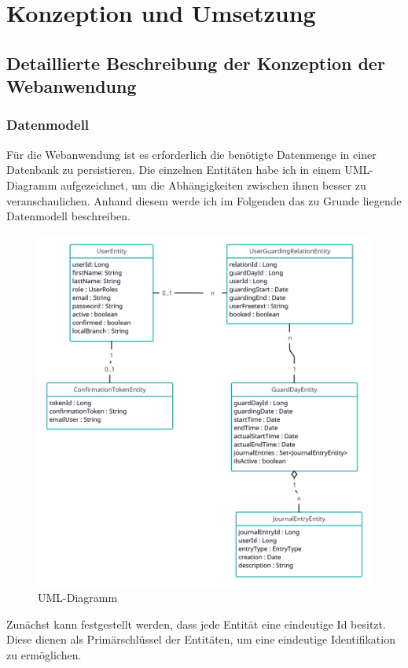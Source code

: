 \documentclass[fontsize=12pt,openright,oneside,paper=a4,BCOR=1cm]{scrbook}
\begin{document}
%
%
\newpage
\renewcommand{\cleardoublepage}{}
\chapter{Konzeption und Umsetzung}

\section{Detaillierte Beschreibung der Konzeption der Webanwendung}

\subsection{Datenmodell}

Für die Webanwendung ist es erforderlich die benötigte Datenmenge in einer Datenbank zu persistieren. Die einzelnen Entitäten habe ich in einem UML-Diagramm aufgezeichnet, um die Abhängigkeiten zwischen ihnen besser zu veranschaulichen. Anhand diesem werde ich im Folgenden das zu Grunde liegende Datenmodell beschreiben.

\begin{figure}[H]
  \centering
  \includegraphics[width=0.7\linewidth]{Anlagen/umlDiagramm.png} 
  \caption{UML-Diagramm}
  \label{fig:anmeldeprozess}
\end{figure}

Zunächst kann festgestellt werden, dass jede Entität eine eindeutige Id besitzt. Diese dienen als Primärschlüssel der Entitäten, um eine eindeutige Identifikation zu ermöglichen.
\end{document}
